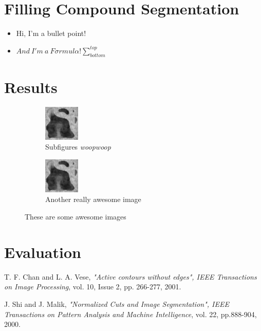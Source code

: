 \documentclass{article}
\begin{document}
  \section{Filling Compound Segmentation}
  \begin{itemize}
  	\item Hi, I'm a bullet point!
  	\item $And~ I'm~ a~ F{\sigma}rmul{\alpha}! \sum_{bottom}^{top}$
  \end{itemize}
  
  \pagebreak
  
  \section{Results}
  {
  \begin{figure}[h]
          \centering
    \begin{subfigure}[t]{0.45\linewidth}
      \centering
      \includegraphics{test.png}
      \caption{Subfigures \textit{woopwoop}}
    \end{subfigure}
    \hfill
    \begin{subfigure}[t]{0.45\linewidth}
      \centering
      \includegraphics{test.png}
      \caption{Another really awesome image}
    \end{subfigure}
    \caption{These are some awesome images}
  \end{figure}
  }
  \pagebreak
  \section{Evaluation}
  
  \pagebreak
  
	\begin{thebibliography}{9}
	
	\bibitem{[ChanVese01]}
	T. F. Chan and L. A. Vese,
	\emph{"Active contours without edges", IEEE Transactions on Image Processing},
	vol. 10, Issue 2, pp. 266-277, 2001.
	
	
	\bibitem{[ShiMalik00]}
	J.  Shi  and  J.  Malik,
	\emph{"Normalized Cuts and Image Segmentation", IEEE Transactions on Pattern Analysis and Machine Intelligence},
	vol. 22, pp.888-904,
	2000.
	
	\end{thebibliography}
\end{document}
